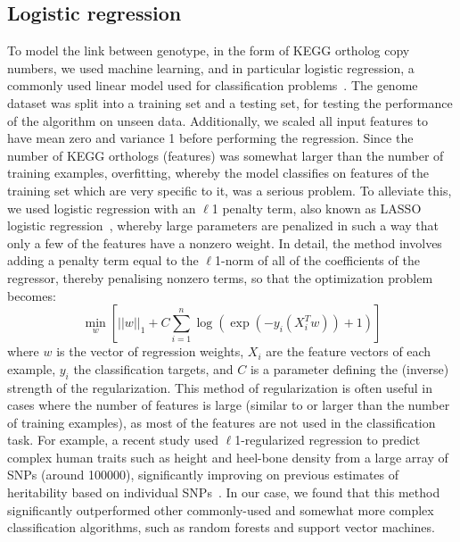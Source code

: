 \documentclass[10pt,letterpaper]{article}
\begin{document}
\subsection*{Logistic regression}
To model the link between genotype, in the form of KEGG ortholog copy numbers, we used machine learning, and in particular logistic regression, a commonly used linear model used for classification problems~\cite{Hastie2009a,Freedman2009}. The genome dataset was split into a training set and a testing set, for testing the performance of the algorithm on unseen data. Additionally, we scaled all input features to have mean zero and variance 1 before performing the regression. Since the number of KEGG orthologs (features) was somewhat larger than the number of training examples, overfitting, whereby the model classifies on features of the training set which are very specific to it, was a serious problem. To alleviate this, we used logistic regression with an $\ell$1 penalty term, also known as LASSO logistic regression~\cite{Lee2006}, whereby large parameters are penalized in such a way that only a few of the features have a nonzero weight. In detail, the method involves adding a penalty term equal to the $\ell$1-norm of all of the coefficients of the regressor, thereby penalising nonzero terms, so that the optimization problem becomes:
\begin{equation}
\min_{w}\left[||w||_1 + C\sum_{i=1}^{n}\log\left(\exp(-y_i(X_i^T w )) + 1\right)\right]
\end{equation}
where $w$ is the vector of regression weights, $X_i$ are the feature vectors of each example, $y_i$ the classification targets, and $C$ is a parameter defining the (inverse) strength of the regularization. This method of regularization is often useful in cases where the number of features is large (similar to or larger than the number of training examples), as most of the features are not used in the classification task. For example, a recent study used $\ell$1-regularized regression to predict complex human traits such as height and heel-bone density from a large array of SNPs (around 100000), significantly improving on previous estimates of heritability based on individual SNPs~\cite{Lello2017}. In our case, we found that this method significantly outperformed other commonly-used and somewhat more complex classification algorithms, such as random forests and support vector machines.
\end{document}
